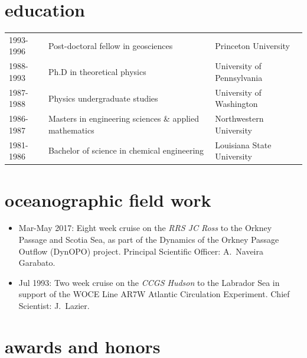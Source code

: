 \documentclass{article}
\begin{document}
\section*{\sc \color{Maroon} education}
\vspace{-.25cm}
\begin{tabular}{lll}
1993-1996  &  Post-doctoral fellow in geosciences  & Princeton University \\
1988-1993  &  Ph.D in theoretical physics  & University of Pennsylvania \\
1987-1988  &  Physics undergraduate studies & University of Washington\\
1986-1987  &  Masters in engineering sciences \& applied mathematics   & Northwestern University\\
1981-1986  &  Bachelor of science in chemical engineering  & Louisiana State University 
\end{tabular}


\section*{\sc \color{Maroon}  oceanographic field work}
\vspace{-.25cm}

\begin{itemize}[leftmargin=*]
 \item 
 Mar-May 2017: Eight week cruise on the {\it RRS JC Ross}  to the Orkney Passage and Scotia Sea,
  as part of the
  Dynamics of the Orkney Passage Outflow (DynOPO) project. Principal Scientific Officer: A.\ Naveira Garabato. 
 \item 
  Jul 1993: Two week cruise on the {\it CCGS Hudson} to the Labrador Sea in support of  the WOCE Line AR7W Atlantic Circulation Experiment. Chief Scientist: J.\ Lazier.
\end{itemize}


\section*{\sc  \color{Maroon}   awards and honors}
\vspace{-.25cm}
\end{document}
